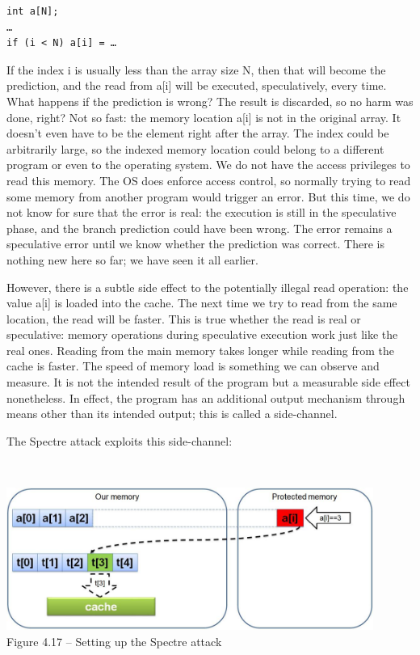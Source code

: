 \begin{lstlisting}[style=styleCXX]
int a[N];
…
if (i < N) a[i] = …
\end{lstlisting}

If the index i is usually less than the array size N, then that will become the prediction, and the read from a[i] will be executed, speculatively, every time. What happens if the prediction is wrong? The result is discarded, so no harm was done, right? Not so fast: the memory location a[i] is not in the original array. It doesn't even have to be the element right after the array. The index could be arbitrarily large, so the indexed memory location could belong to a different program or even to the operating system. We do not have the access privileges to read this memory. The OS does enforce access control, so normally trying to read some memory from another program would trigger an error. But this time, we do not know for sure that the error is real: the execution is still in the speculative phase, and the branch prediction could have been wrong. The error remains a speculative error until we know whether the prediction was correct. There is nothing new here so far; we have seen it all earlier.

However, there is a subtle side effect to the potentially illegal read operation: the value a[i] is loaded into the cache. The next time we try to read from the same location, the read will be faster. This is true whether the read is real or speculative: memory operations during speculative execution work just like the real ones. Reading from the main memory takes longer while reading from the cache is faster. The speed of memory load is something we can observe and measure. It is not the intended result of the program but a measurable side effect nonetheless. In effect, the program has an additional output mechanism through means other than its intended output; this is called a side-channel.

The Spectre attack exploits this side-channel:

\hspace*{\fill} \\ %
\begin{center}
\includegraphics[width=0.9\textwidth]{content/1/chapter4/images/17.jpg}\\
Figure 4.17 – Setting up the Spectre attack
\end{center}

